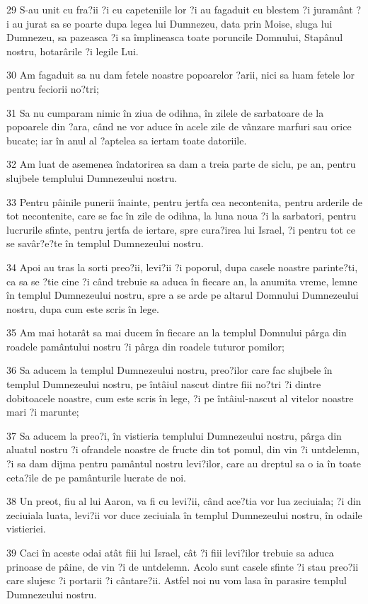 \par 29 S-au unit cu fra?ii ?i cu capeteniile lor ?i au fagaduit cu blestem ?i juramânt ?i au jurat sa se poarte dupa legea lui Dumnezeu, data prin Moise, sluga lui Dumnezeu, sa pazeasca ?i sa împlineasca toate poruncile Domnului, Stapânul nostru, hotarârile ?i legile Lui.
\par 30 Am fagaduit sa nu dam fetele noastre popoarelor ?arii, nici sa luam fetele lor pentru feciorii no?tri;
\par 31 Sa nu cumparam nimic în ziua de odihna, în zilele de sarbatoare de la popoarele din ?ara, când ne vor aduce în acele zile de vânzare marfuri sau orice bucate; iar în anul al ?aptelea sa iertam toate datoriile.
\par 32 Am luat de asemenea îndatorirea sa dam a treia parte de siclu, pe an, pentru slujbele templului Dumnezeului nostru.
\par 33 Pentru pâinile punerii înainte, pentru jertfa cea necontenita, pentru arderile de tot necontenite, care se fac în zile de odihna, la luna noua ?i la sarbatori, pentru lucrurile sfinte, pentru jertfa de iertare, spre cura?irea lui Israel, ?i pentru tot ce se savâr?e?te în templul Dumnezeului nostru.
\par 34 Apoi au tras la sorti preo?ii, levi?ii ?i poporul, dupa casele noastre parinte?ti, ca sa se ?tie cine ?i când trebuie sa aduca în fiecare an, la anumita vreme, lemne în templul Dumnezeului nostru, spre a se arde pe altarul Domnului Dumnezeului nostru, dupa cum este scris în lege.
\par 35 Am mai hotarât sa mai ducem în fiecare an la templul Domnului pârga din roadele pamântului nostru ?i pârga din roadele tuturor pomilor;
\par 36 Sa aducem la templul Dumnezeului nostru, preo?ilor care fac slujbele în templul Dumnezeului nostru, pe întâiul nascut dintre fiii no?tri ?i dintre dobitoacele noastre, cum este scris în lege, ?i pe întâiul-nascut al vitelor noastre mari ?i marunte;
\par 37 Sa aducem la preo?i, în vistieria templului Dumnezeului nostru, pârga din aluatul nostru ?i ofrandele noastre de fructe din tot pomul, din vin ?i untdelemn, ?i sa dam dijma pentru pamântul nostru levi?ilor, care au dreptul sa o ia în toate ceta?ile de pe pamânturile lucrate de noi.
\par 38 Un preot, fiu al lui Aaron, va fi cu levi?ii, când ace?tia vor lua zeciuiala; ?i din zeciuiala luata, levi?ii vor duce zeciuiala în templul Dumnezeului nostru, în odaile vistieriei.
\par 39 Caci în aceste odai atât fiii lui Israel, cât ?i fiii levi?ilor trebuie sa aduca prinoase de pâine, de vin ?i de untdelemn. Acolo sunt casele sfinte ?i stau preo?ii care slujesc ?i portarii ?i cântare?ii. Astfel noi nu vom lasa în parasire templul Dumnezeului nostru.

